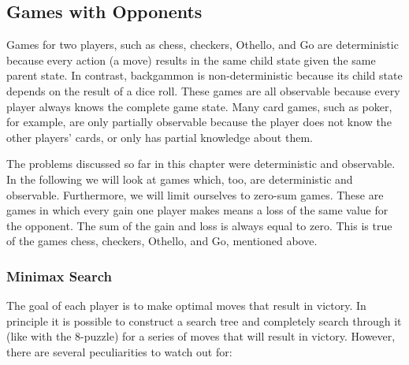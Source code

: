 \documentclass[10pt]{book}
\begin{document}
\subsection*{Games with Opponents}
Games for two players, such as chess, checkers, Othello, and Go are deterministic because every action (a move) results in the same child state given the same parent state. In contrast, backgammon is non-deterministic because its child state depends on the result of a dice roll. These games are all observable because every player always knows the complete game state. Many card games, such as poker, for example, are only partially observable because the player does not know the other players' cards, or only has partial knowledge about them.


The problems discussed so far in this chapter were deterministic and observable. In the following we will look at games which, too, are deterministic and observable. Furthermore, we will limit ourselves to zero-sum games. These are games in which every gain one player makes means a loss of the same value for the opponent. The sum of the gain and loss is always equal to zero. This is true of the games chess, checkers, Othello, and Go, mentioned above.

\subsubsection*{Minimax Search}
The goal of each player is to make optimal moves that result in victory. In principle it is possible to construct a search tree and completely search through it (like with the 8-puzzle) for a series of moves that will result in victory. However, there are several peculiarities to watch out for:
\end{document}

